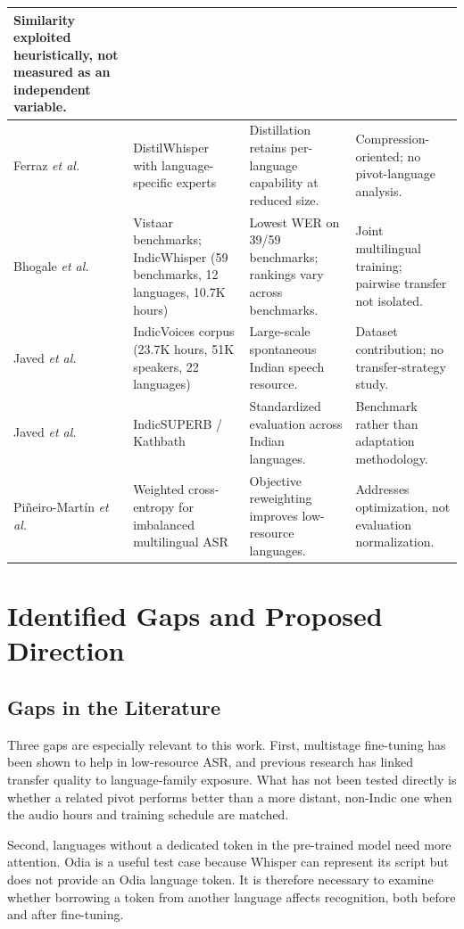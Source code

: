 \documentclass[conference]{IEEEtran}
\begin{document}
\begin{table}[!t]
\begin{tabular}{|p{2.5cm}|p{4.2cm}|p{4.9cm}|p{4.9cm}|}
Similarity exploited heuristically, not measured as an independent variable. \\
\hline
Ferraz \emph{et al.} \cite{ferraz2024distilwhisper} &
DistilWhisper with language-specific experts &
Distillation retains per-language capability at reduced size. &
Compression-oriented; no pivot-language analysis. \\
\hline
Bhogale \emph{et al.} \cite{bhogale2023vistaar} &
Vistaar benchmarks; IndicWhisper (59 benchmarks, 12 languages, 10.7K hours) &
Lowest WER on 39/59 benchmarks; rankings vary across benchmarks. &
Joint multilingual training; pairwise transfer not isolated. \\
\hline
Javed \emph{et al.} \cite{javed2024indicvoices} &
IndicVoices corpus (23.7K hours, 51K speakers, 22 languages) &
Large-scale spontaneous Indian speech resource. &
Dataset contribution; no transfer-strategy study. \\
\hline
Javed \emph{et al.} \cite{javed2023indicsuperb} &
IndicSUPERB / Kathbath &
Standardized evaluation across Indian languages. &
Benchmark rather than adaptation methodology. \\
\hline
Pi\~{n}eiro-Mart\'{i}n \emph{et al.} \cite{pineiro2024weighted} &
Weighted cross-entropy for imbalanced multilingual ASR &
Objective reweighting improves low-resource languages. &
Addresses optimization, not evaluation normalization. \\
\hline
\end{tabular}
\end{table}

\section{Identified Gaps and Proposed Direction}

\subsection{Gaps in the Literature}

Three gaps are especially relevant to this work. First, multistage
fine-tuning has been shown to help in low-resource ASR, and previous
research has linked transfer quality to language-family exposure. What
has not been tested directly is whether a related pivot performs better
than a more distant, non-Indic one when the audio hours and training schedule are
matched.

Second, languages without a dedicated token in the pre-trained model
need more attention. Odia is a useful test case because Whisper can
represent its script but does not provide an Odia language token. It is
therefore necessary to examine whether borrowing a token from another
language affects recognition, both before and after fine-tuning.
\end{document}
